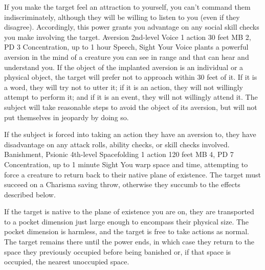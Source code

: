If you make the target feel an attraction to yourself, you
can't command them indiscriminately, although they will be
willing to listen to you (even if they disagree). Accordingly,
this power grants you advantage on any social skill checks
you make involving the target.
\DndPowerHeader%
    {Aversion\label{pwr:aversion}}
    {2nd-level Voice}
    {1 action}
    {30 feet}
    {MB 2, PD 3}
    {Concentration, up to 1 hour}
    {Speech, Sight}
Your Voice plants a powerful aversion in
the mind of a creature you can see in range
and that can hear and understand you. If the object
of the implanted aversion is an individual or a physical object,
the target will prefer not to approach within 30 feet of it.
If it is a word, they will try not to utter it; if it is an
action, they will not willingly attempt to perform it; and
if it is an event, they will not willingly attend it. The
subject will take reasonable steps to avoid the object of
its aversion, but will not put themselves in jeopardy by doing
so.

If the subject is forced into taking an action they have an
aversion to, they have disadvantage on any attack rolls, ability
checks, or skill checks involved.
\DndPowerHeader%
    {Banishment, Psionic\label{pwr:banishment_psionic}}
    {4th-level Spacefolding}
    {1 action}
    {120 feet}
    {MB 4, PD 7}
    {Concentration, up to 1 minute}
    {Sight}
You warp space and time,
attempting to force a creature to return back to their
native plane of existence.
The target must succeed on a Charisma saving throw,
otherwise they succumb to the effects described below.

If the target is native to the plane of existence you are on,
they are transported to a pocket dimension just large enough
to encompass their physical size.
The pocket dimension is harmless,
and the target is free to take actions as normal.
The target remains there until the power ends,
in which case they return to the space they previously occupied
before being banished or, if that space is occupied,
the nearest unoccupied space.

